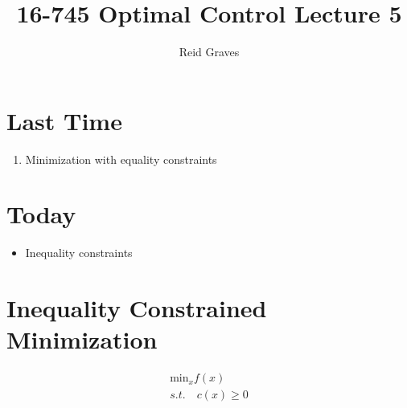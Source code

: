 \documentclass[11pt]{article}
\title{16-745 Optimal Control Lecture 5}
\author{Reid Graves}
\begin{document}
\maketitle

\section{Last Time}
\begin{enumerate}
    \item Minimization with equality constraints
\end{enumerate}

\section{Today}
\begin{itemize}
    \item Inequality constraints
\end{itemize}

\section{Inequality Constrained Minimization}
\begin{align*}
    \text{min}_x f(x)
    \\
    s.t. \quad c(x)\geq 0
\end{align*}
\end{document}

